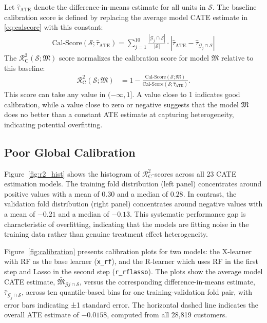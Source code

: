 \documentclass[12pt]{article}
\newcommand{\rsquare}{\ensuremath{\mathcal{R}^2_{\mathrm{C}}}}
\begin{document}
Let $\widehat{\tau}_{\text{ATE}}$ denote the difference-in-means estimate for all units in $\mathcal{S}$. The baseline calibration score is defined by replacing the average model CATE estimate in \eqref{eq:calscore} with this constant:
\begin{align*}
	\text{Cal-Score}(\mathcal{S}; \widehat{\tau}_{\text{ATE}}) = \sum_{j=1}^{10} \frac{|\mathcal{G}_j \cap \mathcal{S}|}{|\mathcal{S}|}\cdot \left| \widehat{\tau}_{\text{ATE}} - \widehat{\tau}_{\mathcal{G}_j \cap \mathcal{S}} \right|
\end{align*}
The $\rsquare(\mathcal{S}; \mathfrak{M})$ score normalizes the calibration score for model $\mathfrak{M}$ relative to this baseline:
\begin{align*}
	\rsquare(\mathcal{S}; \mathfrak{M}) &= 1 - \frac{\text{Cal-Score}(\mathcal{S}; \mathfrak{M})}{\text{Cal-Score}(\mathcal{S}; \widehat{\tau}_{\text{ATE}})}.
\end{align*}
This score can take any value in $(-\infty,1]$. A value close to 1 indicates good calibration, while a value close to zero or negative suggests that the model $\mathfrak{M}$ does no better than a constant ATE estimate at capturing heterogeneity, indicating potential overfitting.

\subsection{Poor Global Calibration}

Figure~\ref{fig:r2_hist} shows the histogram of $\rsquare$-scores across all 23 CATE estimation models. The training fold distribution (left panel) concentrates around positive values with a mean of $0.30$ and a median of $0.28$. In contrast, the validation fold distribution (right panel) concentrates around negative values with a mean of $-0.21$ and a median of $-0.13$. This systematic performance gap is characteristic of overfitting, indicating that the models are fitting noise in the training data rather than genuine treatment effect heterogeneity.

Figure~\ref{fig:calibration} presents calibration plots for two models: the X-learner with RF as the base learner (\texttt{x\_rf}), and the R-learner which uses RF in the first step and Lasso in the second step (\texttt{r\_rflasso}). The plots show the average model CATE estimate, $\bar{\mathfrak{M}}_{\mathcal{G}j \cap \mathcal{S}}$, versus the corresponding difference-in-means estimate, $\widehat{\tau}_{\mathcal{G}_j \cap \mathcal{S}}$, across ten quantile-based bins for one training-validation fold pair, with error bars indicating ±1 standard error. The horizontal dashed line indicates the overall ATE estimate of $-0.0158$, computed from all 28,819 customers.
\end{document}
